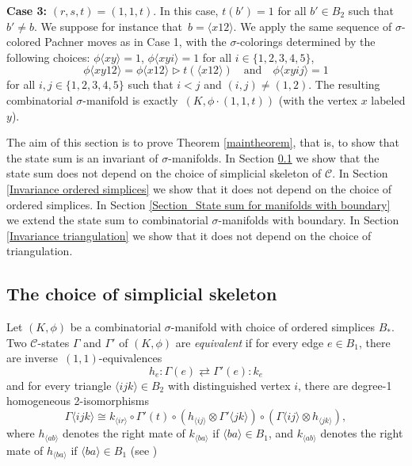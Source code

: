 \documentclass[a4paper, oneside]{amsart}
\makeatletter
\let\origsection\section
\renewcommand\section{\@ifstar{\starsection}{\nostarsection}}
\newcommand\nostarsection[1]
{\sectionprelude\origsection{#1}\sectionpostlude}
\newcommand\starsection[1]
{\sectionprelude\origsection*{#1}\sectionpostlude}
\newcommand\sectionprelude{%
  \vspace{1em}
}
\newcommand\sectionpostlude{%
  \vspace{1em}
}
\numberwithin{equation}{subsection}
\theoremstyle{referencedlemma}
\theoremstyle{plain} %
\theoremstyle{remark}
\makeatother
\begin{document}
\textbf{Case 3:} $(r,s,t) = (1,1,t)$. In this case, $t(b') = 1$ for all $b' \in B_2$ such that $b' \neq b$. We suppose for instance that~$b = \langle x12\rangle$.  We apply the same sequence of $\sigma$-colored Pachner moves as in Case 1, with the $\sigma$-colorings determined by the following choices: $\phi\langle xy\rangle = 1$, $\phi\langle xyi\rangle =1$ for all $i\in \{1,2,3,4,5\}$, 
$$
\phi\langle xy12\rangle = \phi\langle x12\rangle \triangleright t(\langle x12\rangle) \quad \text{and}\quad \phi\langle xyij\rangle =1 
$$
for all $i,j\in \{1,2,3,4,5\}$ such that $i<j$ and $(i,j) \neq (1,2)$. The resulting combinatorial $\sigma$-manifold is exactly~$(K, \phi\cdot (1,1,t))$ (with the vertex $x$ labeled $y$).

\section{Proof of Theorem \ref{maintheorem}}\label{Section. Proof of main theorem}

\noindent The aim of this section is to prove Theorem \ref{maintheorem}, that is, to show that the state sum is an invariant of $\sigma$-manifolds.  In Section \ref{Invariance simplicial skeleton} we show that the state sum does not depend on the choice of simplicial skeleton of $\mathcal{C}$. In Section \ref{Invariance ordered simplices} we show that it does not depend on the choice of ordered simplices.  In Section \ref{Section_State sum for manifolds with boundary} we extend the state sum to combinatorial $\sigma$-manifolds with boundary. In Section \ref{Invariance triangulation} we show that it does not depend on the choice of triangulation. 

\subsection{The choice of simplicial skeleton}\label{Invariance simplicial skeleton}

Let $(K,\phi)$ be a combinatorial $\sigma$-manifold with choice of ordered simplices $B_*$.   Two $\mathcal{C}$-states $\Gamma$ and $\Gamma'$ of $(K,\phi)$ are \emph{equivalent} if for every edge $e \in B_1$, there are inverse~$(1,1)$-equivalences
$$
h_e \colon \Gamma(e) \rightleftarrows \Gamma'(e)\colon k_e
$$
and for every triangle $\langle ijk\rangle\in B_2$ with distinguished vertex $i$, there are degree-1 homogeneous 2-isomorphisms
$$
\Gamma\langle ijk\rangle \cong k_{\langle ir\rangle}\circ \Gamma'(t) \circ (h_{\langle ij\rangle } \otimes \Gamma'\langle jk \rangle) \circ (\Gamma\langle ij\rangle\otimes h_{\langle jk \rangle}),
$$
where $h_{\langle ab\rangle }$ denotes the right mate of $k_{\langle ba\rangle}$ if $\langle ba \rangle \in B_1$, and $k_{\langle ab\rangle }$ denotes the right mate of $h_{\langle ba \rangle } $ if $\langle ba \rangle \in B_1$ (see \cite[Definition 2.2.1]{douglas_fusion_2018})
\end{document}
